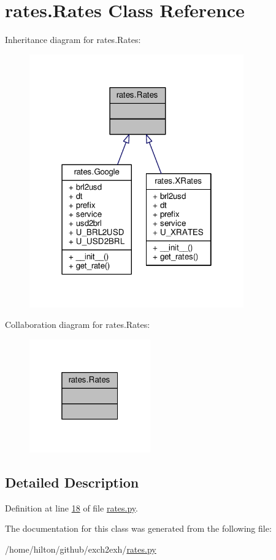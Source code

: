 \hypertarget{classrates_1_1_rates}{}\section{rates.\+Rates Class Reference}
\label{classrates_1_1_rates}


Inheritance diagram for rates.\+Rates\+:
\nopagebreak
\begin{figure}[H]
\begin{center}
\leavevmode
\includegraphics[width=262pt]{classrates_1_1_rates__inherit__graph}
\end{center}
\end{figure}


Collaboration diagram for rates.\+Rates\+:
\nopagebreak
\begin{figure}[H]
\begin{center}
\leavevmode
\includegraphics[width=148pt]{classrates_1_1_rates__coll__graph}
\end{center}
\end{figure}


\subsection{Detailed Description}


Definition at line \hyperlink{rates_8py_source_l00018}{18} of file \hyperlink{rates_8py_source}{rates.\+py}.



The documentation for this class was generated from the following file\+:\begin{DoxyCompactItemize}
\item 
/home/hilton/github/exch2exh/\hyperlink{rates_8py}{rates.\+py}\end{DoxyCompactItemize}
